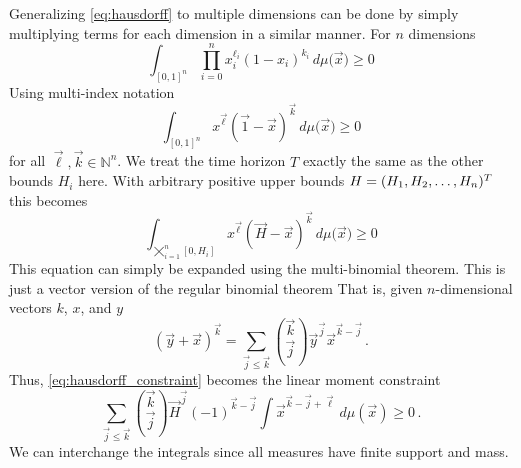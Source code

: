 Generalizing \eqref{eq:hausdorff} to multiple dimensions can be done by simply multiplying terms
for each dimension in a similar manner.
For $n$ dimensions
\begin{equation*}
	\int_{{[0,1]}^n}\prod_{i = 0}^n x_i^{\ell_i}{(1-x_i)}^{k_i}\,d\mu{(\vec{x}})\geq 0
\end{equation*}
Using multi-index notation
\begin{equation*}
	\int_{{[0,1]}^n} x^{\vec{\ell}}{(\vec{1}-\vec{x})}^{\vec{k}}\,d\mu{(\vec{x}})\geq 0
\end{equation*}
for all $\vec\ell, \vec{k}\in\mathbb{N}^{n}$.
We treat the time horizon $T$ exactly the same as the other bounds $H_i$ here.
With arbitrary positive upper bounds $H = (H_1, H_2, \dotsc, H_n)^{T}$ this becomes
\begin{equation}\label{eq:hausdorff_constraint}
    \int_{\bigtimes_{i=1}^n[0,H_i]} x^{\vec{\ell}}{(\vec{H}-\vec{x})}^{\vec{k}}\,d\mu{(\vec{x}})\geq 0
\end{equation}
This equation can simply be expanded using the multi-binomial theorem. %
This is just a vector version of the regular binomial theorem
That is, given $n$-dimensional vectors $k$, $x$, and $y$
\[
    (\vec{y}+\vec{x})^{\vec k} =
    \sum_{\vec j\leq\vec k}
    \binom{\vec k}{\vec j} {\vec{y}}^{\vec j}\vec{x}^{\vec k-\vec j}\,.
\]
Thus, \eqref{eq:hausdorff_constraint} becomes the linear moment constraint
\begin{equation}\label{eq:hausdorff_appl}
    \sum_{\vec j\leq \vec k}
    \binom{\vec{k}}{\vec j}
    {\vec{H}}^{\vec{j}} (-1)^{\vec k-\vec j}
    \int
    {\vec x}^{\vec k-\vec j+\vec \ell} \,d\mu(\vec x)\geq 0\,.
\end{equation}
We can interchange the integrals since all measures have finite support and mass.

